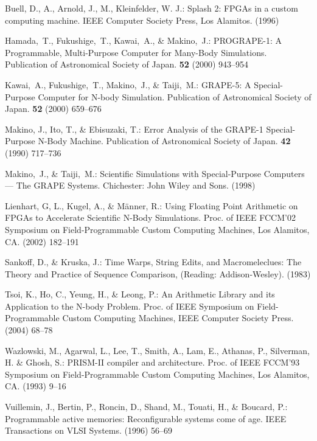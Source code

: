 \documentclass{llncs}
\begin{document}

\begin{thebibliography}{}

Buell, D., A., Arnold, J., M., Kleinfelder, W. J.:
Splash 2: FPGAs in a custom computing machine.
IEEE Computer Society Press, Los Alamitos.
(1996)

Hamada,~T., Fukushige,~T., Kawai,~A., \& Makino,~J.:
PROGRAPE-1: A Programmable, Multi-Purpose Computer for Many-Body Simulations.
Publication of Astronomical Society of Japan.
{\bfseries 52} (2000) 943--954

Kawai,~A., Fukushige,~T., Makino,~J., \& Taiji,~M.:
GRAPE-5: A Special-Purpose Computer for N-body Simulation.
Publication of Astronomical Society of Japan.
{\bfseries 52} (2000) 659--676

Makino, J., Ito, T., \& Ebisuzaki, T.:
Error Analysis of the GRAPE-1 Special-Purpose N-Body Machine.
Publication of Astronomical Society of Japan.
{\bfseries 42} (1990) 717--736

Makino,~J., \& Taiji,~M.:
Scientific Simulations with Special-Purpose Computers --- The GRAPE Systems.
Chichester: John Wiley and Sons.
(1998)

Lienhart, G, L., Kugel, A., \& M{\"a}nner, R.:
Using Floating Point Arithmetic on FPGAs to Accelerate Scientific N-Body Simulations.
Proc. of IEEE FCCM'02 Symposium on Field-Programmable Custom Computing Machines, 
Los Alamitos, CA.
(2002) 182--191

Sankoff, D., \& Kruska, J.:
Time Warps, String Edits, and Macromeleclues:
The Theory and Practice of Sequence Comparison, (Reading: Addison-Wesley).
(1983)

Tsoi, K., Ho, C., Yeung, H., \& Leong, P.:
An Arithmetic Library and its Application to the N-body Problem.
Proc. of IEEE Symposium on Field-Programmable Custom Computing Machines, 
IEEE Computer Society Press.
(2004) 68--78

Wazlowski, M., Agarwal, L., Lee, T., Smith, A., Lam, E., Athanas, P., Silverman, H. \& Ghosh, S.:
PRISM-II compiler and architecture. 
Proc. of IEEE FCCM'93 Symposium on Field-Programmable Custom Computing Machines, 
Los Alamitos, CA.
(1993) 9--16 

Vuillemin, J., Bertin, P., Roncin, D., Shand, M., Touati, H., \& Boucard, P.:
Programmable active memories: Reconfigurable systems come of age.
IEEE Transactions on VLSI Systems.
(1996) 56--69

\end{thebibliography}
\end{document}
